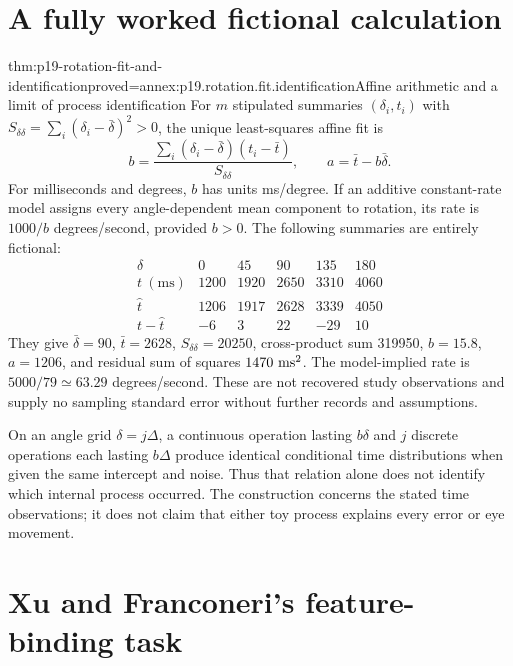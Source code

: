 \section{A fully worked fictional calculation}
\label{sec:p19-rotation-worked-example}

\begin{hbtheorem}{thm:p19-rotation-fit-and-identification}{proved=annex:p19.rotation.fit.identification}{Affine arithmetic and a limit of process identification}
For \(m\) stipulated summaries \((\delta_i,t_i)\) with
\(S_{\delta\delta}=\sum_i(\delta_i-\bar\delta)^2>0\), the unique
least-squares affine fit is
\[
 b=\frac{\sum_i(\delta_i-\bar\delta)(t_i-\bar t)}
          {S_{\delta\delta}},\qquad a=\bar t-b\bar\delta.
\]
For milliseconds and degrees, \(b\) has units ms/degree.
If an additive constant-rate model assigns every angle-dependent
mean component to rotation, its rate is \(1000/b\) degrees/second,
provided \(b>0\).
The following summaries are entirely fictional:
\[
\begin{array}{c|rrrrr}
\delta&0&45&90&135&180\\\hline
t\ (\mathrm{ms})&1200&1920&2650&3310&4060\\
\widehat t&1206&1917&2628&3339&4050\\
t-\widehat t&-6&3&22&-29&10
\end{array}
\]
They give \(\bar\delta=90\), \(\bar t=2628\),
\(S_{\delta\delta}=20250\), cross-product sum 319950,
\(b=15.8\), \(a=1206\), and residual sum of squares
\(1470\ {\rm ms}^2\). The model-implied rate is
\(5000/79\simeq63.29\) degrees/second.
These are not recovered study observations and supply no sampling
standard error without further records and assumptions.

On an angle grid \(\delta=j\Delta\), a continuous operation
lasting \(b\delta\) and \(j\) discrete operations each lasting
\(b\Delta\) produce identical conditional time distributions
when given the same intercept and noise. Thus that relation
alone does not identify which internal process occurred.
The construction concerns the stated time observations; it does
not claim that either toy process explains every error or eye movement.
\end{hbtheorem}

\section{Xu and Franconeri's feature-binding task}
\label{sec:p19-xu-franconeri}

